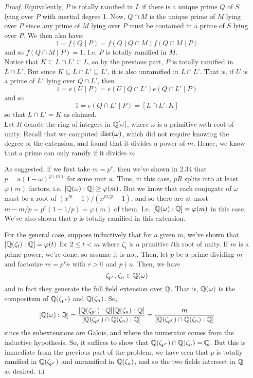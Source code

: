 \begin{proof}
	Equivalently, $P$ is totally ramified in $L$ if there is a unique prime $Q$ of $S$ lying over $P$ with inertial degree 1. Now, $Q \cap M$ is the unique prime of $M$ lying over $P$ since any prime of $M$ lying over $P$ must be contained in a prime of $S$ lying over $P$. We then also have:
	\[ 1 = f(Q \mid P) = f(Q \mid Q \cap M)f(Q \cap M \mid P) \]
	and so $f(Q \cap M \mid P) = 1$. I.e. $P$ is totally ramified in $M$. \\
	
	Notice that $K \subseteq L \cap L' \subseteq L$, so by the previous part, $P$ is totally ramified in $L \cap L'$. But since $K \subseteq L \cap L' \subseteq L'$, it is also unramified in $L \cap L'$. That is, if $U$ is a prime of $L'$ lying over $Q \cap L'$, then
	\[ 1 = e(U \mid P) = e(U \mid Q \cap L')e(Q \cap L' \mid P) \]
	and so
	\[ 1 = e(Q \cap L' \mid P) = [L \cap L' : K] \]
	so that $L \cap L' = K$ as claimed. \\
	
	Let $R$ denote the ring of integers in $\mathbb{Q}[\omega]$, where $\omega$ is a primitive $m$th root of unity. Recall that we computed $\operatorname{disc}(\omega)$, which did not require knowing the degree of the extension, and found that it divides a power of $m$. Hence, we know that a prime can only ramify if it divides $m$.
	
	As suggested, if we first take $m = p^r$, then we've shown in 2.34 that $p = u(1-\omega)^{\varphi(m)}$ for some unit $u$. Thus, in this case, $pR$ splits into at least $\varphi(m)$ factors, i.e. $[\mathbb{Q}(\omega) : \mathbb{Q}] \geq \varphi(m)$. But we know that each conjugate of $\omega$ must be a root of $(x^m-1)/(x^{m/p}-1)$, and so there are at most $m-m/p = p^r(1-1/p) = \varphi(m)$ of them. I.e. $[\mathbb{Q}(\omega):\mathbb{Q}] = \varphi(m)$ in this case. We've also shown that $p$ is totally ramified in this extension.
	
	For the general case, suppose inductively that for a given $m$, we've shown that $[\mathbb{Q}(\zeta_t) : \mathbb{Q}] = \varphi(t)$ for $2 \leq t < m$ where $\zeta_t$ is a primitive $t$th root of unity. If $m$ is a prime power, we're done, so assume it is not. Then, let $p$ be a prime dividing $m$ and factorize $m = p^rn$ with $r > 0$ and $p \nmid n$. Then, we have
	\[ \zeta_{p^r},\zeta_n \in \mathbb{Q}(\omega) \]
	and in fact they generate the full field extension over $\mathbb{Q}$. That is, $\mathbb{Q}(\omega)$ is the compositum of $\mathbb{Q}(\zeta_{p^r})$ and $\mathbb{Q}(\zeta_n)$. So,
	\[ [\mathbb{Q}(\omega) : \mathbb{Q}] = \frac{[\mathbb{Q}(\zeta_{p^r}) : \mathbb{Q}][\mathbb{Q}(\zeta_n) : \mathbb{Q}]}{[\mathbb{Q}(\zeta_{p^r}) \cap \mathbb{Q}(\zeta_n) : \mathbb{Q}]} = \frac{m}{[\mathbb{Q}(\zeta_{p^r}) \cap \mathbb{Q}(\zeta_n) : \mathbb{Q}]} \]
	since the subextensions are Galois, and where the numerator comes from the inductive hypothesis. So, it suffices to show that $\mathbb{Q}(\zeta_{p^r}) \cap \mathbb{Q}(\zeta_n) = \mathbb{Q}$. But this is immediate from the previous part of the problem; we have seen that $p$ is totally ramified in $\mathbb{Q}(\zeta_{p^r})$ and unramified in $\mathbb{Q}(\zeta_n)$, and so the two fields intersect in $\mathbb{Q}$ as desired.
\end{proof}
